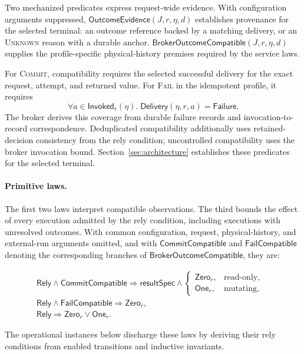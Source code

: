 \documentclass[acmsmall,screen,review,anonymous]{acmart}
\newcommand{\Unknown}{\textsc{Unknown}\xspace}
\newcommand{\Commit}{\textsc{Commit}\xspace}
\newcommand{\Fail}{\textsc{Fail}\xspace}
\begin{document}
Two mechanized predicates express request-wide evidence. With configuration
arguments suppressed, $\mathsf{OutcomeEvidence}(J,r,\eta,d)$ establishes
provenance for the selected terminal: an outcome reference backed by a
matching delivery, or an \Unknown reason with a durable anchor.
$\mathsf{BrokerOutcomeCompatible}(J,r,\eta,d)$ supplies the profile-specific
physical-history premises required by the service laws.

For \Commit, compatibility requires the selected successful delivery
for the exact request, attempt, and returned value. For \Fail in the
idempotent profile, it requires
\[
  \forall a\in\mathsf{Invoked}_r(\eta).\;
  \mathsf{Delivery}(\eta,r,a)=\mathsf{Failure}.
\]
The broker derives this coverage from durable failure records and
invocation-to-record correspondence. Deduplicated compatibility additionally
uses retained-decision consistency from the rely condition; uncontrolled
compatibility uses the broker invocation bound. Section~\ref{sec:architecture} establishes these
predicates for the selected terminal.

\paragraph{Primitive laws.}
The first two laws interpret compatible observations. The third
bounds the effect of every execution admitted by the rely condition,
including executions with unresolved outcomes. With common
configuration, request, physical-history, and external-run arguments
omitted, and with $\mathsf{CommitCompatible}$ and
$\mathsf{FailCompatible}$ denoting the corresponding branches of
$\mathsf{BrokerOutcomeCompatible}$, they are:

\begin{align}
  &\mathsf{Rely}\land\mathsf{CommitCompatible}
    \Rightarrow
    \mathsf{resultSpec}\land
    \begin{cases}
      \mathsf{Zero}_r, & \text{read-only},\\
      \mathsf{One}_r, & \text{mutating},
    \end{cases}
    && \tag{Success}\\[0.5ex]
  &\mathsf{Rely}\land\mathsf{FailCompatible}
    \Rightarrow\mathsf{Zero}_r,
    && \tag{Failure}\\[0.5ex]
  &\mathsf{Rely}
    \Rightarrow\mathsf{Zero}_r\lor\mathsf{One}_r.
    && \tag{Bound}
\end{align}

The operational instances below discharge these laws by deriving their rely
conditions from enabled transitions and inductive invariants.
\end{document}
